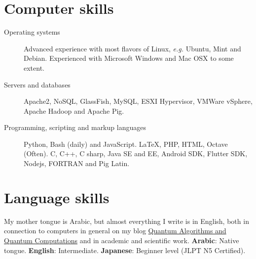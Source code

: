 \documentclass[margin,line,a4paper]{resume}
\begin{document}
\begin{resume}
\begin{itemize}
\end{itemize}

    
    

\section{\mysidestyle Computer skills}\vspace{1mm}
\begin{description}
\item[Operating systems] Advanced experience with most flavors of Linux, \textit{e.g.} Ubuntu, Mint and Debian. Experienced with Microsoft Windows and Mac OSX to some extent.
    \item[Servers and databases] Apache2, NoSQL, GlassFish, MySQL, ESXI Hypervisor, VMWare vSphere, Apache Hadoop and Apache Pig.


    \item[Programming, scripting and markup languages] Python, Bash (daily) and JavaScript. \LaTeX, PHP, HTML, Octave (Often). C, C++, C sharp, Java SE and EE, Android SDK, Flutter SDK, Nodejs, FORTRAN and Pig Latin.
\end{description}
    

\section{\mysidestyle Language skills}
    My mother tongue is Arabic, but almost everything I write is in English, both in connection to computers in general on my blog \href{https://qaqcblog.quora.com/}{Quantum Algorithms and Quantum Computations} and in academic and scientific work. \textbf{Arabic}: Native tongue. \textbf{English}: Intermediate. \textbf{Japanese}: Beginner level (JLPT N5 Certified).
   
\end{resume}
\end{document}
